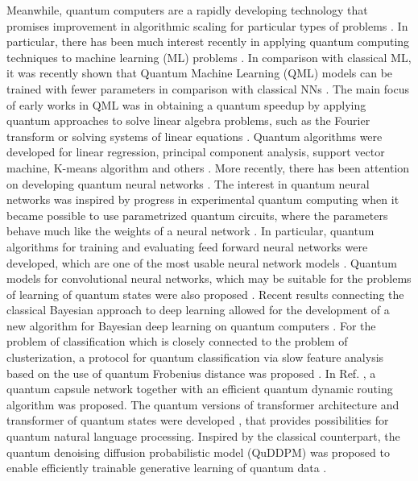\documentclass[pra,showkeys,twocolumn,showpacs,aps,10pt]{revtex4-2}
\begin{document}
Meanwhile, quantum computers are a rapidly developing technology that promises improvement in algorithmic scaling for particular types of problems \cite{nielsen2010quantum,Cerezo2021,Bharti2022,byrnes2021quantum}.
In particular, there has been much interest recently in applying quantum computing techniques to machine learning (ML) problems \cite{dunjko2018, biamonte2017, schuld2014, carleo2019, Benedetti2019, Cerezo2022, Sajjan2022}. In comparison with classical ML, it was recently shown that Quantum Machine Learning (QML) models can be trained with fewer parameters in comparison with classical NNs \cite{abbasPowerQuantumNeural2021,caroGeneralizationQuantumMachine2022}.
The main focus of early works in QML was in obtaining a quantum speedup \cite{biamonte2017, schuld2014} by applying quantum approaches to solve linear algebra problems, such as the Fourier transform or solving systems of linear equations \cite{wiebe2012,harrow2009,childs2017}.
Quantum algorithms were developed for  linear regression, principal component analysis, support vector machine, K-means algorithm and others \cite{lloyd2013,lloyd2014,dunjko2016,paparo2014,rebentrost2014}.
More recently, there has been attention on developing quantum neural networks \cite{kamruzzaman2019, schuld2014b, jeswal2019, broughton2020}.
The interest in quantum neural networks was inspired by progress in experimental quantum computing when it became possible to use parametrized quantum circuits,
where the parameters behave much like the weights of a neural network \cite{lewenstein1994,Benedetti2019}.
In particular, quantum algorithms for training and evaluating feed forward neural networks were developed,
which are one of the most usable neural network models \cite{allcock2018, tacchino2019}. Quantum models for convolutional neural networks, which may be suitable for the problems of learning of quantum states were also proposed \cite{cong2019, liu2019}. Recent results connecting the classical Bayesian approach to deep learning allowed for the development of a new algorithm for Bayesian deep learning on quantum computers \cite{zhao2019,daiQuantumBayesianOptimization2023}. For the problem of classification which is closely connected to the problem of clusterization, a protocol for quantum classification via slow feature analysis based on the use of quantum Frobenius distance was proposed \cite{kerenidis2018}.
In Ref.  \cite{Liu2022}, a quantum capsule network together with an efficient quantum dynamic routing algorithm was proposed.
The quantum versions of transformer architecture and transformer of quantum states were developed \cite{Viteritti2023,cherratQuantumVisionTransformers2024,khatriQuixerQuantumTransformer2024,zhangTransformerQuantumState2023}, that provides possibilities for quantum natural language processing. Inspired by the classical counterpart, the quantum denoising diffusion probabilistic model (QuDDPM) was proposed to enable efficiently trainable generative learning of quantum data \cite{zhangGenerativeQuantumMachine2024}.
\end{document}
